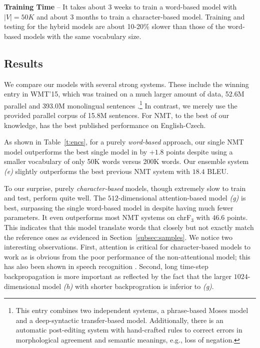 \documentclass[11pt]{article}
\newcommand{\modelchar}{{\it (g)}}
\newcommand{\chr}{chrF$_3$}
\begin{document}
{\bf Training Time} -- It takes about 3 weeks to train a word-based model with
$|V|=50K$ and about 3 months to train a character-based model. Training and
testing for the hybrid models are about 10-20\% slower than those of the word-based
models with the same vocabulary size.

\subsection{Results}

We compare our models with several strong systems. These include the
winning entry in WMT'15, which was
trained on a much larger amount of data, 52.6M parallel
 and 393.0M monolingual sentences \cite{bojar15wmt}.\footnote{This
entry combines two independent
systems, a phrase-based Moses model and a deep-syntactic transfer-based model.
Additionally, there is  an automatic
post-editing system with hand-crafted rules to correct errors
in morphological agreement and semantic meanings, e.g., loss of negation.}
In contrast, we merely use the
provided parallel corpus of 15.8M sentences. %
For NMT, to the best of our knowledge, \cite{jean15wmt} has
the best published performance on English-Czech.

As shown in Table~\ref{t:encs}, for a purely {\it word-based} approach, 
our single NMT model outperforms the best single model in \cite{jean15wmt} by
+$1.8$ points despite
using a smaller vocabulary of only 50K words versus 200K words. 
Our ensemble system {\it (e)} slightly outperforms the best previous NMT system with $18.4$ BLEU.

To our surprise, purely {\it character-based} models, though extremely slow to
train and test, perform quite well. The $512$-dimensional attention-based model \modelchar{} is
best, surpassing the single word-based model in
\cite{jean15wmt} despite having much fewer parameters. It even outperforms most NMT
systems  
on \chr{} with $46.6$ points. This indicates that this model translate words that closely but
not exactly match the reference ones as evidenced in
Section~\ref{subsec:samples}. 
We notice two interesting observations. First,
attention is critical for character-based models to work as is obvious from the
poor performance of the non-attentional model; this has also been shown in speech
recognition \cite{chan16}. Second, long time-step backpropagation is more important
as reflected by the fact that the larger $1024$-dimensional model {\it (h)} with shorter
backprogration is inferior to \modelchar{}. 
\end{document}
